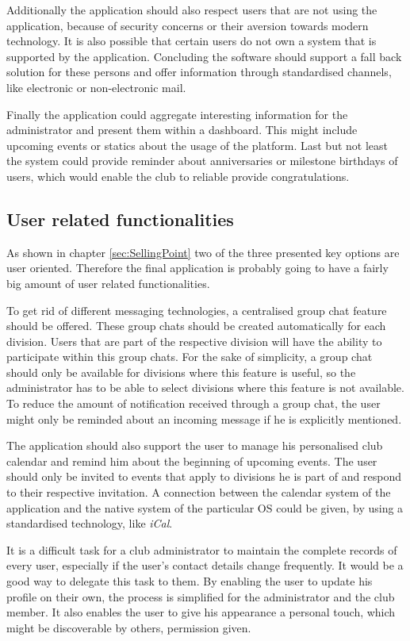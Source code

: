 Additionally the application should also respect users that are not using the application, because of security concerns or their aversion towards modern technology. It is also possible that certain users do not own a system that is supported by the application. Concluding the software should support a fall back solution for these persons and offer information through standardised channels, like electronic or non-electronic mail.

Finally the application could aggregate interesting information for the administrator and present them within a dashboard. This might include upcoming events or statics about the usage of the platform. Last but not least the system could provide reminder about anniversaries or milestone birthdays of users, which would enable the club to reliable provide congratulations.

\subsection{User related functionalities}

As shown in chapter \vref{sec:SellingPoint} two of the three presented key options are user oriented. Therefore the final application is probably going to have a fairly big amount of user related functionalities.

To get rid of different messaging technologies, a centralised group chat feature should be offered. These group chats should be created automatically for each division. Users that are part of the respective division will have the ability to participate within this group chats. For the sake of simplicity, a group chat should only be available for divisions where this feature is useful, so the administrator has to be able to select divisions where this feature is not available. To reduce the amount of notification received through a group chat, the user might only be reminded about an incoming message if he is explicitly mentioned.

The application should also support the user to manage his personalised club calendar and remind him about the beginning of upcoming events. The user should only be invited to events that apply to divisions he is part of and respond to their respective invitation. A connection between the calendar system of the application and the native system of the particular \gls{OS} could be given, by using a standardised technology, like \emph{iCal}.

It is a difficult task for a club administrator to maintain the complete records of every user, especially if the user's contact details change frequently. It would be a good way to delegate this task to them. By enabling the user to update his profile on their own, the process is simplified for the administrator and the club member. It also enables the user to give his appearance a personal touch, which might be discoverable by others, permission given.

